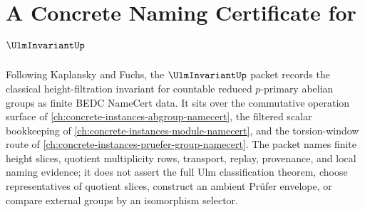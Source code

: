 \chapter{A Concrete Naming Certificate for $\UlmInvariantUp$}
\label{ch:concrete-instances-ulm-invariant-namecert}

Following Kaplansky and Fuchs, the $\UlmInvariantUp$ packet records the classical height-filtration invariant for countable reduced $p$-primary abelian groups as finite BEDC NameCert data. It sits over the commutative operation surface of \autoref{ch:concrete-instances-abgroup-namecert}, the filtered scalar bookkeeping of \autoref{ch:concrete-instances-module-namecert}, and the torsion-window route of \autoref{ch:concrete-instances-pruefer-group-namecert}. The packet names finite height slices, quotient multiplicity rows, transport, replay, provenance, and local naming evidence; it does not assert the full Ulm classification theorem, choose representatives of quotient slices, construct an ambient Prüfer envelope, or compare external groups by an isomorphism selector.

